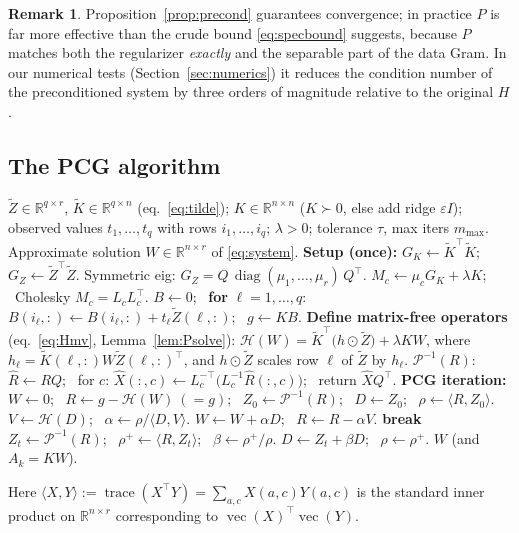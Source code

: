 \documentclass[12pt]{article}
\DeclareMathOperator{\vecop}{vec}
\DeclareMathOperator{\diag}{diag}
\newcommand{\bR}{\mathbb{R}}
\newcommand{\tZ}{\tilde Z}
\newcommand{\tK}{\tilde K}
\theoremstyle{definition}
\newtheorem{remark}{Remark}
\begin{document}
\begin{remark}
Proposition~\ref{prop:precond} guarantees convergence; in practice $P$ is far more
effective than the crude bound \eqref{eq:specbound} suggests, because $P$ matches
both the regularizer \emph{exactly} and the separable part of the data Gram. In our
numerical tests (Section~\ref{sec:numerics}) it reduces the condition number of the
preconditioned system by three orders of magnitude relative to the original $H$.
\end{remark}

\subsection{The PCG algorithm}

\begin{algorithm}[t]
\caption{Matrix-free PCG for the RKHS mode-$k$ subproblem}
\label{alg:pcg}
\begin{algorithmic}[1]
\Require $\tZ\in\bR^{q\times r}$, $\tK\in\bR^{q\times n}$ (eq.~\eqref{eq:tilde});
$K\in\bR^{n\times n}$ ($K\succ0$, else add ridge $\varepsilon I$); observed values
$t_1,\dots,t_q$ with rows $i_1,\dots,i_q$; $\lambda>0$; tolerance $\tau$, max iters
$m_{\max}$.
\Ensure Approximate solution $W\in\bR^{n\times r}$ of \eqref{eq:system}.
\Statex \textbf{Setup (once):}
\State $G_K\gets \tK^\top\tK$;\quad $G_Z\gets \tZ^\top\tZ$. 
\State Symmetric eig: $G_Z=Q\,\diag(\mu_1,\dots,\mu_r)\,Q^\top$.
 \State $M_c\gets \mu_c G_K+\lambda K$; \ Cholesky $M_c=L_cL_c^\top$. \EndFor
\State $B\gets 0$; \ \textbf{for} $\ell=1,\dots,q$: $B(i_\ell,:)\gets B(i_\ell,:)+t_\ell\tZ(\ell,:)$; \ $g\gets KB$. 
\Statex \textbf{Define matrix-free operators} (eq.~\eqref{eq:Hmv}, Lemma~\ref{lem:Psolve}):
\Statex \quad $\mathcal H(W)=\tK^\top\!\big(h\!\odot\!\tZ\big)+\lambda KW$, where
$h_\ell=\tK(\ell,:)W\tZ(\ell,:)^\top$, and $h\odot\tZ$ scales row $\ell$ of $\tZ$ by $h_\ell$.
\Statex \quad $\mathcal P^{-1}(R)$: $\hat R\gets RQ$; \ for $c$: $\hat X(:,c)\gets L_c^{-\top}\!\big(L_c^{-1}\hat R(:,c)\big)$; \ return $\hat XQ^\top$.
\Statex \textbf{PCG iteration:}
\State $W\gets 0$; \ $R\gets g-\mathcal H(W)\ (=g)$; \ $Z_0\gets\mathcal P^{-1}(R)$; \ $D\gets Z_0$; \ $\rho\gets\langle R,Z_0\rangle$.
  \State $V\gets \mathcal H(D)$; \ $\alpha\gets \rho/\langle D,V\rangle$.
  \State $W\gets W+\alpha D$; \ $R\gets R-\alpha V$.
   \textbf{break} \EndIf
  \State $Z_t\gets \mathcal P^{-1}(R)$; \ $\rho^+\gets\langle R,Z_t\rangle$; \ $\beta\gets \rho^+/\rho$.
  \State $D\gets Z_t+\beta D$; \ $\rho\gets\rho^+$.
\EndFor
\State \Return $W$ \quad(and $A_k=KW$).
\end{algorithmic}
\end{algorithm}
Here $\langle X,Y\rangle:=\operatorname{trace}(X^\top Y)=\sum_{a,c}X(a,c)Y(a,c)$ is
the standard inner product on $\bR^{n\times r}$ corresponding to
$\vecop(X)^\top\vecop(Y)$.
\end{document}
